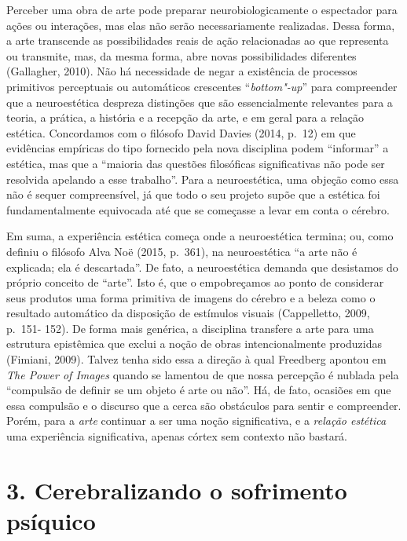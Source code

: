 Perceber uma obra de arte pode preparar neurobiologicamente o espectador
para ações ou interações, mas elas não serão necessariamente realizadas.
Dessa forma, a arte transcende as possibilidades reais de ação
relacionadas ao que representa ou transmite, mas, da mesma forma, abre
novas possibilidades diferentes (Gallagher, 2010). Não há necessidade de
negar a existência de processos primitivos perceptuais ou automáticos
crescentes ``\emph{bottom"-up}'' para compreender que a neuroestética
despreza distinções que são essencialmente relevantes para a teoria, a
prática, a história e a recepção da arte, e em geral para a relação
estética. Concordamos com o filósofo David Davies (2014, p.~12) em que
evidências empíricas do tipo fornecido pela nova disciplina podem
``informar'' a estética, mas que a ``maioria das questões filosóficas
significativas não pode ser resolvida apelando a esse trabalho''. Para a
neuroestética, uma objeção como essa não é sequer compreensível, já que
todo o seu projeto supõe que a estética foi fundamentalmente equivocada
até que se começasse a levar em conta o cérebro.

Em suma, a experiência estética começa onde a neuroestética termina; ou,
como definiu o filósofo Alva Noë (2015, p.~361), na neuroestética ``a
arte não é explicada; ela é descartada''. De fato, a neuroestética
demanda que desistamos do próprio conceito de ``arte''. Isto é, que o
empobreçamos ao ponto de considerar seus produtos uma forma primitiva de
imagens do cérebro e a beleza como o resultado automático da disposição
de estímulos visuais (Cappelletto, 2009, p.~151- 152). De forma mais
genérica, a disciplina transfere a arte para uma estrutura epistêmica
que exclui a noção de obras intencionalmente produzidas (Fimiani, 2009).
Talvez tenha sido essa a direção à qual Freedberg apontou em \emph{The
Power of Images} quando se lamentou de que nossa percepção é nublada
pela ``compulsão de definir se um objeto é arte ou não''. Há, de fato,
ocasiões em que essa compulsão e o discurso que a cerca são obstáculos
para sentir e compreender. Porém, para a \emph{arte} continuar a ser uma
noção significativa, e a \emph{relação estética} uma experiência
significativa, apenas córtex sem contexto não bastará.

\part{3. Cerebralizando o sofrimento psíquico}

\chapter*{}

